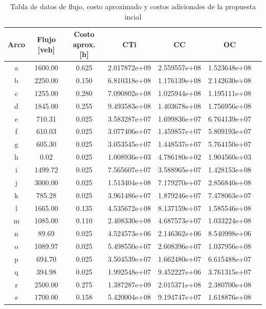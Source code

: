 \documentclass[letterpaper,12pt]{article}
\begin{document}
\begin{table}[H]
    \centering
    \begin{tabular}{ccccccc}
        \toprule
        \textbf{Arco} & \textbf{Flujo [veh]} & \textbf{Costo aprox. [h]} & \textbf{CTi} & \textbf{CC} & \textbf{OC} \\
        \midrule
        a & 1600.00 & 0.625 & 2.017872e+09 & 2.559557e+08 & 1.523648e+08 \\
        b & 2250.00 & 0.150 & 6.810318e+08 & 1.176139e+08 & 2.142630e+08 \\
        c & 1255.00 & 0.280 & 7.090802e+08 & 1.025944e+08 & 1.195111e+08 \\
        d & 1845.00 & 0.255 & 9.493583e+08 & 1.403678e+08 & 1.756956e+08 \\
        e & 710.31  & 0.025 & 3.583287e+07 & 1.699836e+07 & 6.764139e+07 \\
        f & 610.03  & 0.025 & 3.077406e+07 & 1.459857e+07 & 5.809193e+07 \\
        g & 605.30  & 0.025 & 3.053545e+07 & 1.448537e+07 & 5.764150e+07 \\
        h & 0.02    & 0.025 & 1.008936e+03 & 4.786180e+02 & 1.904560e+03 \\
        i & 1499.72 & 0.025 & 7.565607e+07 & 3.588965e+07 & 1.428153e+08 \\
        j & 3000.00 & 0.025 & 1.513404e+08 & 7.179270e+07 & 2.856840e+08 \\
        k & 785.28  & 0.025 & 3.961486e+07 & 1.879246e+07 & 7.478063e+07 \\
        l & 1665.00 & 0.135 & 4.535672e+08 & 8.137159e+07 & 1.585546e+08 \\
        m & 1085.00 & 0.110 & 2.408330e+08 & 4.687573e+07 & 1.033224e+08 \\
        n & 89.69   & 0.025 & 4.524573e+06 & 2.146362e+06 & 8.540998e+06 \\
        o & 1089.97 & 0.025 & 5.498550e+07 & 2.608396e+07 & 1.037956e+08 \\
        p & 694.70  & 0.025 & 3.504539e+07 & 1.662480e+07 & 6.615488e+07 \\
        q & 394.98  & 0.025 & 1.992548e+07 & 9.452227e+06 & 3.761315e+07 \\
        r & 2500.00 & 0.275 & 1.387287e+09 & 2.015371e+08 & 2.380700e+08 \\
        s & 1700.00 & 0.158 & 5.420004e+08 & 9.194747e+07 & 1.618876e+08 \\
        \bottomrule
    \end{tabular}
    \caption{Tabla de datos de flujo, costo aproximado y costos adicionales de la propuesta incial}
    \label{tab:datos_actualizados}
\end{table}
\end{document}
